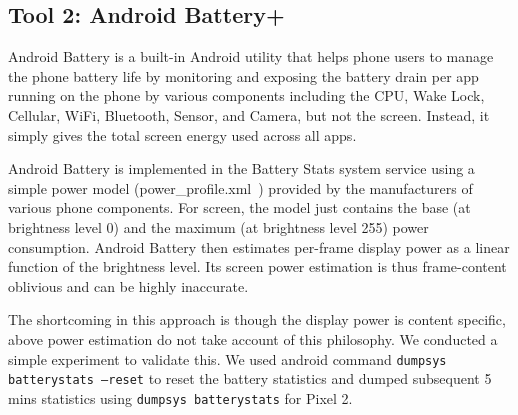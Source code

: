 \subsection{Tool 2: Android Battery+}
\label{subsec:tool2}

%    
%     

Android Battery is a built-in Android utility that helps phone users to
manage the phone battery life by monitoring and exposing the battery drain
per app running on the phone by various components including the CPU,
Wake Lock, Cellular, WiFi, Bluetooth, Sensor, and Camera, but not the
screen. Instead, it simply gives the total screen energy used across
all apps.

Android Battery is implemented in the Battery Stats system service using a simple power model
(power\_profile.xml~\cite{AOSPPowerProfile}) provided by the
manufacturers of various phone components. For screen, the model just
contains the base (at brightness level 0) and the maximum (at brightness level 255) power
consumption. Android Battery then estimates
  per-frame display power as a linear function of the brightness level.
  Its screen power estimation is thus frame-content oblivious and can be highly
  inaccurate.

The shortcoming in this approach is though the display power is content 
specific, above power estimation do not take account of this philosophy.
We conducted a simple experiment to validate this. We used android command
{\small \tt dumpsys batterystats --reset} to reset the battery statistics and
dumped subsequent 5 mins statistics using {\small \tt dumpsys batterystats} for Pixel 2.

